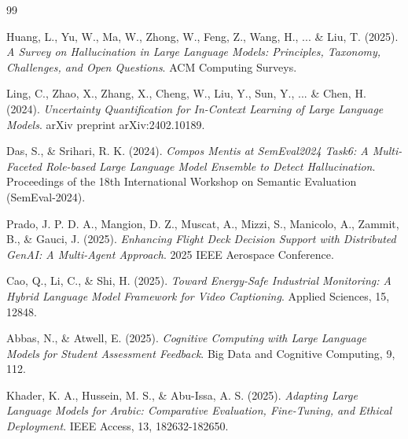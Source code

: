 \documentclass[12pt,a4paper]{article}
\begin{document}
\begin{thebibliography}{99}

Huang, L., Yu, W., Ma, W., Zhong, W., Feng, Z., Wang, H., ... \& Liu, T. (2025). 
\textit{A Survey on Hallucination in Large Language Models: Principles, Taxonomy, Challenges, and Open Questions}. 
ACM Computing Surveys.

Ling, C., Zhao, X., Zhang, X., Cheng, W., Liu, Y., Sun, Y., ... \& Chen, H. (2024). 
\textit{Uncertainty Quantification for In-Context Learning of Large Language Models}. 
arXiv preprint arXiv:2402.10189. %

Das, S., \& Srihari, R. K. (2024). 
\textit{Compos Mentis at SemEval2024 Task6: A Multi-Faceted Role-based Large Language Model Ensemble to Detect Hallucination}. 
Proceedings of the 18th International Workshop on Semantic Evaluation (SemEval-2024).

Prado, J. P. D. A., Mangion, D. Z., Muscat, A., Mizzi, S., Manicolo, A., Zammit, B., \& Gauci, J. (2025). 
\textit{Enhancing Flight Deck Decision Support with Distributed GenAI: A Multi-Agent Approach}. 
2025 IEEE Aerospace Conference.

Cao, Q., Li, C., \& Shi, H. (2025). 
\textit{Toward Energy-Safe Industrial Monitoring: A Hybrid Language Model Framework for Video Captioning}. 
Applied Sciences, 15, 12848.

Abbas, N., \& Atwell, E. (2025). 
\textit{Cognitive Computing with Large Language Models for Student Assessment Feedback}. 
Big Data and Cognitive Computing, 9, 112.

Khader, K. A., Hussein, M. S., \& Abu-Issa, A. S. (2025). 
\textit{Adapting Large Language Models for Arabic: Comparative Evaluation, Fine-Tuning, and Ethical Deployment}. 
IEEE Access, 13, 182632-182650.

\end{thebibliography}
\end{document}
